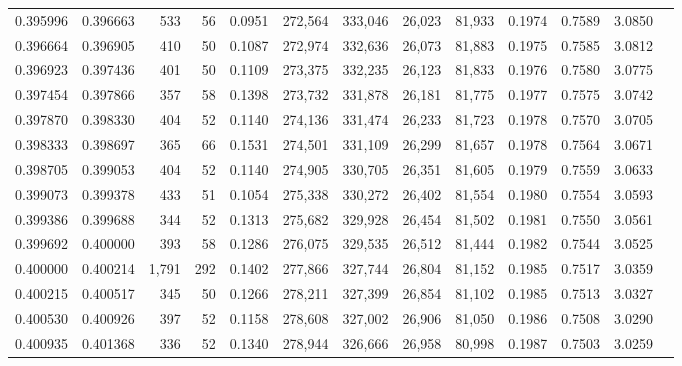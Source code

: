 \begin{tabular}{rrrrrrrrrrrrr}
0.395996 & 0.396663 &    533 &    56 &                                     0.0951 & 272,564 & 333,046 &  26,023 &  81,933 & 0.1974 & 0.7589 & 3.0850 \\
0.396664 & 0.396905 &    410 &    50 &                                     0.1087 & 272,974 & 332,636 &  26,073 &  81,883 & 0.1975 & 0.7585 & 3.0812 \\
0.396923 & 0.397436 &    401 &    50 &                                     0.1109 & 273,375 & 332,235 &  26,123 &  81,833 & 0.1976 & 0.7580 & 3.0775 \\
0.397454 & 0.397866 &    357 &    58 &                                     0.1398 & 273,732 & 331,878 &  26,181 &  81,775 & 0.1977 & 0.7575 & 3.0742 \\
0.397870 & 0.398330 &    404 &    52 &                                     0.1140 & 274,136 & 331,474 &  26,233 &  81,723 & 0.1978 & 0.7570 & 3.0705 \\
0.398333 & 0.398697 &    365 &    66 &                                     0.1531 & 274,501 & 331,109 &  26,299 &  81,657 & 0.1978 & 0.7564 & 3.0671 \\
0.398705 & 0.399053 &    404 &    52 &                                     0.1140 & 274,905 & 330,705 &  26,351 &  81,605 & 0.1979 & 0.7559 & 3.0633 \\
0.399073 & 0.399378 &    433 &    51 &                                     0.1054 & 275,338 & 330,272 &  26,402 &  81,554 & 0.1980 & 0.7554 & 3.0593 \\
0.399386 & 0.399688 &    344 &    52 &                                     0.1313 & 275,682 & 329,928 &  26,454 &  81,502 & 0.1981 & 0.7550 & 3.0561 \\
0.399692 & 0.400000 &    393 &    58 &                                     0.1286 & 276,075 & 329,535 &  26,512 &  81,444 & 0.1982 & 0.7544 & 3.0525 \\
0.400000 & 0.400214 &  1,791 &   292 &                                     0.1402 & 277,866 & 327,744 &  26,804 &  81,152 & 0.1985 & 0.7517 & 3.0359 \\
0.400215 & 0.400517 &    345 &    50 &                                     0.1266 & 278,211 & 327,399 &  26,854 &  81,102 & 0.1985 & 0.7513 & 3.0327 \\
0.400530 & 0.400926 &    397 &    52 &                                     0.1158 & 278,608 & 327,002 &  26,906 &  81,050 & 0.1986 & 0.7508 & 3.0290 \\
0.400935 & 0.401368 &    336 &    52 &                                     0.1340 & 278,944 & 326,666 &  26,958 &  80,998 & 0.1987 & 0.7503 & 3.0259 \\

\end{tabular}
